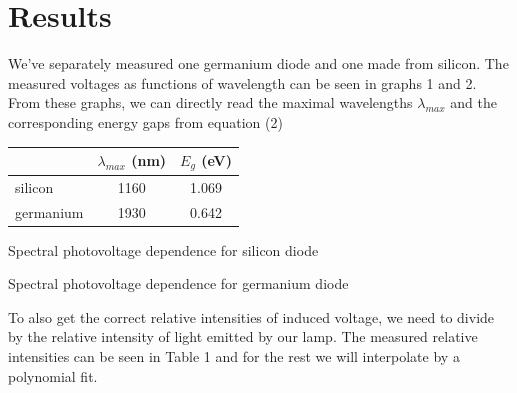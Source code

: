 \documentclass[a4paper,11pt]{article}
\begin{document}
\section{Results}

We've separately measured one germanium diode and one made from silicon. The measured voltages as functions of wavelength can be seen in graphs 1 and 2. From these graphs, we can directly read the maximal wavelengths $ \lambda_{max} $  and the corresponding energy gaps from equation (2)

\begin{table}[htpb]
    \centering
    \begin{tabular}{l c c}
        & $ \lambda_{max} $ (nm) & $ E_g $ (eV) \\ \hline
        silicon & 1160 & 1.069 \\
        germanium & 1930 &  0.642 \\ 
    \end{tabular}
\end{table}

 

\begin{table}[htpb]
    \begin{minipage}[b]{.45\linewidth}
        \centering
        \resizebox{\textwidth}{!}{  }
        \captionsetup{type=graph}
        \caption{Spectral photovoltage dependence for silicon diode}
    \end{minipage} 
    \hfill
    \begin{minipage}[b]{.45\linewidth}
        \centering
        \resizebox{\textwidth}{!}{  }
        \captionsetup{type=graph}
        \caption{Spectral photovoltage dependence for germanium diode}
    \end{minipage} 
\end{table}

To also get the correct relative intensities of induced voltage, we need to divide by the relative intensity of light emitted by our lamp. The measured relative intensities can be seen in Table 1 and for the rest we will interpolate by a polynomial fit.
\end{document}
